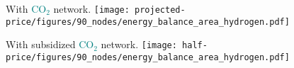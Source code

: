 \documentclass[12pt, aspectratio=169]{beamer}
\newcommand{\carbon}{\textcolor{teal}{CO$_2$}}
\begin{document}
\begin{frame}
    \begin{center}
    With \carbon{} network.
    \texttt{[image: projected-price/figures/90\_nodes/energy\_balance\_area\_hydrogen.pdf]}
    \end{center}
\end{frame}


\begin{frame}
    \begin{center}
    With subsidized \carbon{} network.
    \texttt{[image: half-price/figures/90\_nodes/energy\_balance\_area\_hydrogen.pdf]}
    \end{center}
\end{frame}
\end{document}
